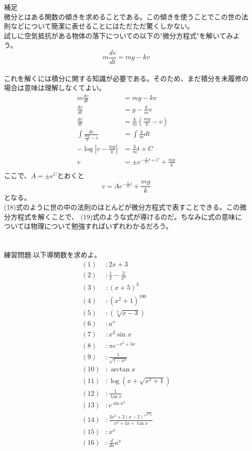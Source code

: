 \documentclass[a4j,dvipdfmx]{jsarticle}
\begin{document}
    補足\\
    微分とはある関数の傾きを求めることである。この傾きを使うことでこの世の法則などについて簡潔に表せることにはただただ驚くしかない。\\
    試しに空気抵抗がある物体の落下についての以下の"微分方程式"を解いてみよう。\\
    \begin{equation}
        m\frac{dv}{dt}=mg-kv
    \end{equation}\\
    これを解くには積分に関する知識が必要である。そのため、まだ積分を未履修の場合は意味は理解しなくてよい。\\
    \begin{align*}
        m\frac{dv}{dt}&=mg-kv\\
        \frac{dv}{dt}&=g-\frac{k}{m}v\\
        \frac{dv}{dt}&=\frac{k}{m}(\frac{mg}{k}-v)\\
        \int \frac{dv}{\frac{mg}{k}-v}&=\int\frac{k}{m}dt\\
        -\log|v-\frac{mg}{k}|&=\frac{k}{m}t+C\\
        v&=\pm e^{-\frac{k}{m}t+C}+\frac{mg}{k}\\
    \end{align*}
    ここで、$A=\pm e^C$とおくと
    \begin{equation}
        v=Ae^{-\frac{k}{m}t}+\frac{mg}{k}
    \end{equation}
    となる。\\
    (18)式のように世の中の法則のほとんどが微分方程式で表すことできる。この微分方程式を解くことで、
    (19)式のような式が導けるのだ。ちなみに式の意味については物理について勉強すればいずれわかるだろう。\\\\\\
    練習問題:以下導関数を求めよ。
    \begin{align*}
        (1)&:2x+3\\
        (2)&:\frac{1}{x}-\frac{2}{x^2}\\
        (3)&:(x+5)^3\\
        (4)&:(x^2+1)^{100}\\
        (5)&:(\sqrt[3]{x-3})\\
        (6)&:a^x\\
        (7)&:x^2\sin x\\
        (8)&:\pi e^{-x^2+3x}\\
        (9)&:\frac{1}{\sqrt{1-x^2}}\\
        (10)&:\arctan x\\
        (11)&:\log(x+\sqrt{x^2+1})\\
        (12)&:\frac{1}{\tan x}\\
        (13)&:e^{\sin x^2}\\
        (14)&:\frac{3x^3+2(x-2)^{\sqrt{e^3x}}}{x^2+4x+\tan x}\\
        (15)&:x^x\\
        (16)&:\frac{d}{da}a^x
    \end{align*}
\end{document}
